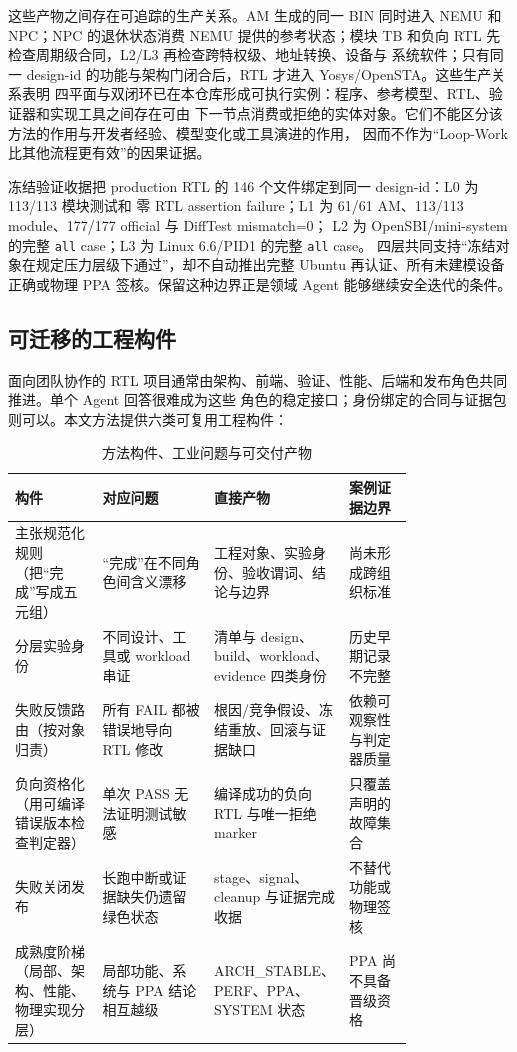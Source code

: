\documentclass[UTF8,a4paper,zihao=-4,oneside]{ctexart}
\begin{document}
这些产物之间存在可追踪的生产关系。AM 生成的同一 BIN 同时进入 NEMU 和 NPC；NPC 的退休状态消费
NEMU 提供的参考状态；模块 TB 和负向 RTL 先检查周期级合同，L2/L3 再检查跨特权级、地址转换、设备与
系统软件；只有同一 design-id 的功能与架构门闭合后，RTL 才进入 Yosys/OpenSTA。这些生产关系表明
四平面与双闭环已在本仓库形成可执行实例：程序、参考模型、RTL、验证器和实现工具之间存在可由
下一节点消费或拒绝的实体对象。它们不能区分该方法的作用与开发者经验、模型变化或工具演进的作用，
因而不作为“Loop-Work 比其他流程更有效”的因果证据。

冻结验证收据把 production RTL 的 146 个文件绑定到同一 design-id：L0 为 113/113 模块测试和
零 RTL assertion failure；L1 为 61/61 AM、113/113 module、177/177 official 与 DiffTest mismatch=0；
L2 为 OpenSBI/mini-system 的完整 \texttt{all} case；L3 为 Linux 6.6/PID1 的完整 \texttt{all} case。
四层共同支持“冻结对象在规定压力层级下通过”，却不自动推出完整 Ubuntu 再认证、所有未建模设备
正确或物理 PPA 签核。保留这种边界正是领域 Agent 能够继续安全迭代的条件。

\subsection{可迁移的工程构件}

面向团队协作的 RTL 项目通常由架构、前端、验证、性能、后端和发布角色共同推进。单个 Agent 回答很难成为这些
角色的稳定接口；身份绑定的合同与证据包则可以。本文方法提供六类可复用工程构件：

\begin{table}[htbp]
  \centering
  \small
  \caption{方法构件、工业问题与可交付产物}
  \label{tab:industry-contribution}
  \begin{tabularx}{\linewidth}{@{}L{0.22\linewidth}L{0.29\linewidth}L{0.28\linewidth}Y@{}}
    \toprule
    构件 & 对应问题 & 直接产物 & 案例证据边界 \\
    \midrule
    主张规范化规则（把“完成”写成五元组） & “完成”在不同角色间含义漂移 & 工程对象、实验身份、验收谓词、结论与边界 & 尚未形成跨组织标准 \\
    分层实验身份 & 不同设计、工具或 workload 串证 & 清单与 design、build、workload、evidence 四类身份 & 历史早期记录不完整 \\
    失败反馈路由（按对象归责） & 所有 FAIL 都被错误地导向 RTL 修改 & 根因/竞争假设、冻结重放、回滚与证据缺口 & 依赖可观察性与判定器质量 \\
    负向资格化（用可编译错误版本检查判定器） & 单次 PASS 无法证明测试敏感 & 编译成功的负向 RTL 与唯一拒绝 marker & 只覆盖声明的故障集合 \\
    失败关闭发布 & 长跑中断或证据缺失仍遗留绿色状态 & stage、signal、cleanup 与证据完成收据 & 不替代功能或物理签核 \\
    成熟度阶梯（局部、架构、性能、物理实现分层） & 局部功能、系统与 PPA 结论相互越级 & ARCH\_STABLE、PERF、PPA、SYSTEM 状态 & PPA 尚不具备晋级资格 \\
    \bottomrule
  \end{tabularx}
\end{table}
\end{document}
